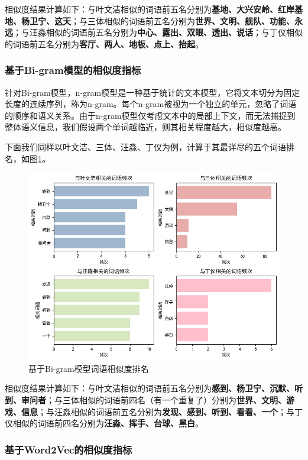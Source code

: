 \documentclass[12pt]{xjtureport}
\begin{document}
相似度结果计算如下：与叶文洁相似的词语前五名分别为\textbf{基地、大兴安岭、红岸基地、杨卫宁、这天}；与三体相似的词语前五名分别为\textbf{世界、文明、舰队、功能、永远}；与汪淼相似的词语前五名分别为\textbf{中心、露出、双眼、透出、说话}；与丁仪相似的词语前五名分别为\textbf{客厅、两人、地板、点上、抬起}。

\subsubsection{基于Bi-gram模型的相似度指标}

针对Bi-gram模型，n-gram模型是一种基于统计的文本模型，它将文本切分为固定长度的连续序列，称为n-gram。每个n-gram被视为一个独立的单元，忽略了词语的顺序和语义关系。由于n-gram模型仅考虑文本中的局部上下文，而无法捕捉到整体语义信息，我们假设两个单词越临近，则其相关程度越大，相似度越高。 

下面我们同样以叶文洁、三体、汪淼、丁仪为例，计算于其最详尽的五个词语排名，如图\ref{Bi-gram}。

\begin{figure}[!htbp]
    \centering
    \includegraphics[width=0.8\linewidth]{figures/Bi-gram.png}
    \caption{基于Bi-gram模型词语相似度排名}
    \label{Bi-gram}
\end{figure}

相似度结果计算如下：与叶文洁相似的词语前五名分别为\textbf{感到、杨卫宁、沉默、听到、审问者}；与三体相似的词语前四名（有一个重复了）分别为\textbf{世界、文明、游戏、信息}；与汪淼相似的词语前五名分别为\textbf{发现、感到、听到、看看、一个}；与丁仪相似的词语前四名分别为\textbf{汪淼、挥手、台球、黑白}。

\subsubsection{基于Word2Vec的相似度指标}
\end{document}
